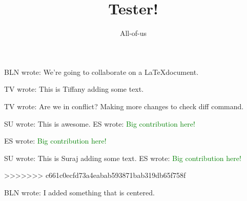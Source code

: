 \documentclass[12pt]{article}
\title{Tester!}
\author{All-of-us}
\newcommand{\bln}[1]{BLN wrote: \textcolor{red!70!blue!70}{#1}}
\newcommand{\tv}[1]{TV wrote: \textcolor{blue!70}{#1}}
\newcommand{\su}[1]{SU wrote: \textcolor{green!70}{#1}}
\newcommand{\es}[1]{ES wrote: \textcolor{green}{#1}}
\begin{document}
\maketitle

\bln{We're going to collaborate on a \LaTeX document.}

\tv{This is Tiffany adding some text.}

\tv{Are we in conflict? Making more changes to check diff command.}

\su{This is awesome.}
\es{Big contribution here!}



\es{Big contribution here!}

\su{This is Suraj adding some text.}
\es{Big contribution here!}


>>>>>>> c661c0ecfd73a4eabab593871bab319db65f758f
\begin{center}
  \bln{I added something that is centered.}
\end{center}
\end{document}
